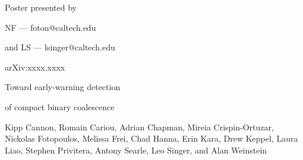 \documentclass[portrait,plainboxedsections]{sciposter}
\begin{document}
\begin{minipage}[b]{0.25\textwidth}
\raggedleft
{\fontsize{36}{50}\selectfont
Poster presented by

NF --- foton@caltech.edu

and LS --- lsinger@caltech.edu

}
\vspace{32mm}

\fontsize{36}{40}\selectfont
arXiv:xxxx.xxxx
\end{minipage}%
\hspace{0.05\textwidth}%
\begin{minipage}[b]{0.6\textwidth}
{\fontsize{80}{100}\selectfont%
Toward early-warning detection

of compact binary coalescence

\vspace{0.5em}
\fontsize{30}{40}\selectfont
	Kipp Cannon,
	Romain Cariou,
	Adrian Chapman,
	Mireia Crispin-Ortuzar,
	Nickolas Fotopoulos,
	Melissa Frei,
	Chad Hanna,
	Erin Kara,
	Drew Keppel,
	Laura Liao,
	Stephen Privitera,
	Antony Searle,
	Leo Singer, and
	Alan Weinstein

}
\end{minipage}
\vspace{1cm}
\end{document}
